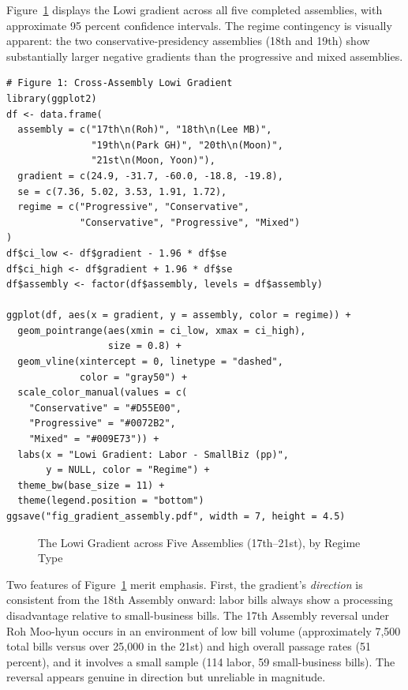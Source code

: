 \documentclass[11pt]{article}
\begin{document}
Figure~\ref{fig:gradient} displays the Lowi gradient across all five completed assemblies, with approximate 95 percent confidence intervals. The regime contingency is visually apparent: the two conservative-presidency assemblies (18th and 19th) show substantially larger negative gradients than the progressive and mixed assemblies.

\begin{verbatim}
# Figure 1: Cross-Assembly Lowi Gradient
library(ggplot2)
df <- data.frame(
  assembly = c("17th\n(Roh)", "18th\n(Lee MB)",
               "19th\n(Park GH)", "20th\n(Moon)",
               "21st\n(Moon, Yoon)"),
  gradient = c(24.9, -31.7, -60.0, -18.8, -19.8),
  se = c(7.36, 5.02, 3.53, 1.91, 1.72),
  regime = c("Progressive", "Conservative",
             "Conservative", "Progressive", "Mixed")
)
df$ci_low <- df$gradient - 1.96 * df$se
df$ci_high <- df$gradient + 1.96 * df$se
df$assembly <- factor(df$assembly, levels = df$assembly)

ggplot(df, aes(x = gradient, y = assembly, color = regime)) +
  geom_pointrange(aes(xmin = ci_low, xmax = ci_high),
                  size = 0.8) +
  geom_vline(xintercept = 0, linetype = "dashed",
             color = "gray50") +
  scale_color_manual(values = c(
    "Conservative" = "#D55E00",
    "Progressive" = "#0072B2",
    "Mixed" = "#009E73")) +
  labs(x = "Lowi Gradient: Labor - SmallBiz (pp)",
       y = NULL, color = "Regime") +
  theme_bw(base_size = 11) +
  theme(legend.position = "bottom")
ggsave("fig_gradient_assembly.pdf", width = 7, height = 4.5)
\end{verbatim}

\begin{figure}[H]
\centering
{}
\caption{The Lowi Gradient across Five Assemblies (17th--21st), by Regime Type}
\label{fig:gradient}
\end{figure}

Two features of Figure~\ref{fig:gradient} merit emphasis. First, the gradient's \emph{direction} is consistent from the 18th Assembly onward: labor bills always show a processing disadvantage relative to small-business bills. The 17th Assembly reversal under Roh Moo-hyun occurs in an environment of low bill volume (approximately 7,500 total bills versus over 25,000 in the 21st) and high overall passage rates (51 percent), and it involves a small sample (114 labor, 59 small-business bills). The reversal appears genuine in direction but unreliable in magnitude.
\end{document}
